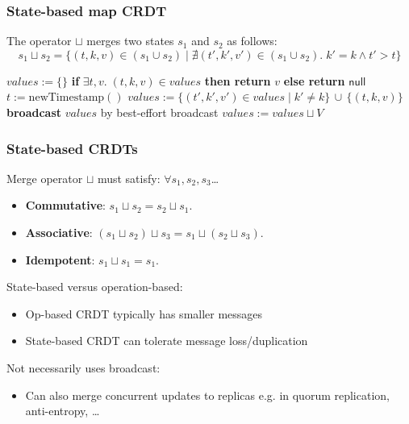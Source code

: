 \begin{frame}
    \label{s:state-crdt-map}
    \frametitle{State-based map CRDT}
    \footnotesize
    The operator $\sqcup$ merges two states $s_1$ and $s_2$ as follows:
    \[ s_1 \sqcup s_2 = \{(t,k,v) \in (s_1 \cup s_2) \mid \nexists (t',k',v') \in (s_1 \cup s_2).\; k' = k \wedge t' > t\} \]
    \begin{algorithmic}
            \State $\mathit{values} := \{\}$
        \EndOn
        \State
            \State \textbf{if} $\exists t,v.\; (t,k,v) \in \mathit{values}$ \textbf{then return} $v$ \textbf{else return} $\mathsf{null}$
        \EndOn
        \State
            \State $t := \mathrm{newTimestamp}()$ 
            \State $\mathit{values} := \{(t',k',v') \in \mathit{values} \mid k' \neq k\} \,\cup\, \{(t,k,v)\}$
            \State \textbf{broadcast} $\mathit{values}$ by best-effort broadcast
        \EndOn
        \State
            \State $\mathit{values} := \mathit{values} \sqcup V$
        \EndOn
    \end{algorithmic}
\end{frame}
\label{l:state-crdt-map}

\begin{frame}
    \label{s:state-crdt}
    \frametitle{State-based CRDTs}
    Merge operator $\sqcup$ must satisfy: $\forall s_1, s_2, s_3$\dots
    \begin{itemize}
        \item \textbf{Commutative}: $s_1 \sqcup s_2 = s_2 \sqcup s_1.$
        \item \textbf{Associative}: $(s_1 \sqcup s_2) \sqcup s_3 = s_1 \sqcup (s_2 \sqcup s_3).$
        \item \textbf{Idempotent}: $s_1 \sqcup s_1 = s_1.$\\[1em]\pause
    \end{itemize}
    State-based versus operation-based:
    \begin{itemize}
        \item Op-based CRDT typically has smaller messages
        \item State-based CRDT can tolerate message loss/duplication\\[1em]\pause
    \end{itemize}
    Not necessarily uses broadcast:
    \begin{itemize}
        \item Can also merge concurrent updates to replicas e.g. in quorum replication, anti-entropy, \dots
    \end{itemize}
\end{frame}
\label{l:state-crdt}

